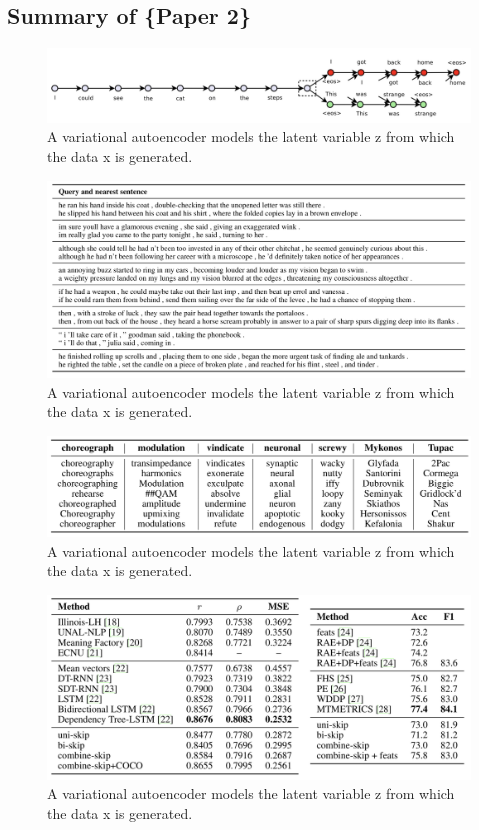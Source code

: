 \subsection{Summary of \{Paper 2\}}
\begin{figure}
\centering
  \includegraphics[width=.5\linewidth]{files/skipthoughts-1.png}
  \caption{A variational autoencoder models the latent variable z from which the data x is generated.}
  \label{fig:vae}
\end{figure}

\begin{figure}
\centering
  \includegraphics[width=.5\linewidth]{files/skipthoughts-2.png}
  \caption{A variational autoencoder models the latent variable z from which the data x is generated.}
  \label{fig:vae}
\end{figure}

\begin{figure}
\centering
  \includegraphics[width=.5\linewidth]{files/skipthoughts-3.png}
  \caption{A variational autoencoder models the latent variable z from which the data x is generated.}
  \label{fig:vae}
\end{figure}

\begin{figure}
\centering
  \includegraphics[width=.5\linewidth]{files/skipthoughts-4.png}
  \caption{A variational autoencoder models the latent variable z from which the data x is generated.}
  \label{fig:vae}
\end{figure}

